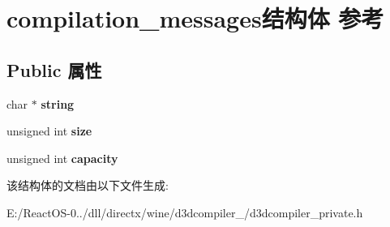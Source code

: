 \hypertarget{structcompilation__messages}{}\section{compilation\+\_\+messages结构体 参考}
\label{structcompilation__messages}
\subsection*{Public 属性}
\begin{DoxyCompactItemize}
\item 
\mbox{\label{structcompilation__messages_ae749e0ae095743919ef9037472693f5a}} 
char $\ast$ {\bfseries string}
\item 
\mbox{\label{structcompilation__messages_aadf2b8aaba82337d9c6dbdc45cfca610}} 
unsigned int {\bfseries size}
\item 
\mbox{\label{structcompilation__messages_a13a5316a68dcb09a2f629b5fd10f7e78}} 
unsigned int {\bfseries capacity}
\end{DoxyCompactItemize}


该结构体的文档由以下文件生成\+:\begin{DoxyCompactItemize}
\item 
E\+:/\+React\+O\+S-\/0../dll/directx/wine/d3dcompiler\+\_/d3dcompiler\+\_\+private.\+h\end{DoxyCompactItemize}
